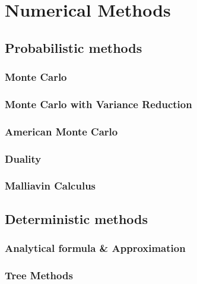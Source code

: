 \documentclass{book}
\begin{document}
\part{Numerical Methods}
\label{part:numerical-methods}

\chapter{Probabilistic methods}
\label{cha:probabilistes}

\section{Monte Carlo}
\label{sec:monte-carlo}

\section{Monte Carlo with Variance Reduction}
\label{sec:monte-carlo-with}

\section{American Monte Carlo}
\label{sec:american-monte-carlo}

\section{Duality}
\label{sec:duality}

\section{Malliavin Calculus}
\label{sec:malliavin}



\chapter{Deterministic methods}
\label{cha:probabilistes-1}

\section{Analytical formula \& Approximation}
\label{sec:analytical-formula-}

\section{Tree Methods}
\label{sec:tree-methods}
\end{document}
